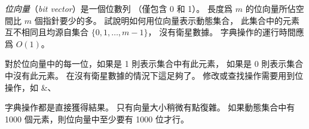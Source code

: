 \startEXERCISE
\emph{位向量}（\emph{bit vector}）是一個位數列
（僅包含 0 和 1）。
長度爲 $m$ 的位向量所佔空間比 $m$ 個指針要少的多。
試說明如何用位向量表示動態集合，
此集合中的元素互不相同且均源自集合 $\{0,1,\ldots,m-1\}$，
沒有衛星數據。
字典操作的運行時間應爲 $O(1)$。
\stopEXERCISE

\startANSWER
對於位向量中的每一位，如果是 1 則表示集合中有此元素，
如果是 0 則表示集合中沒有此元素。
在沒有衛星數據的情況下這足夠了。
修改或查找操作需要用到位操作，如 \&、 \|。

字典操作都是直接獲得結果。
只有向量大小稍微有點復雜。
如果動態集合中有 1000 個元素，則位向量中至少要有 1000 位才行。
\stopANSWER
